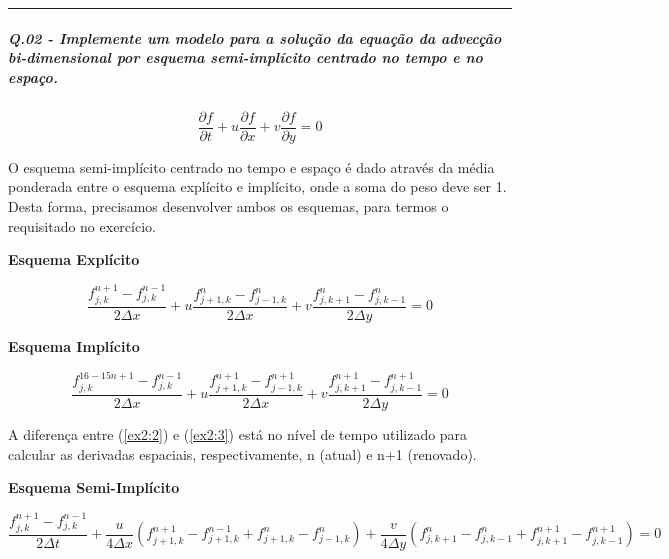 \documentclass[11pt]{article}
\begin{document}
    \begin{center}\rule{0.5\linewidth}{\linethickness}\end{center}

    \subparagraph{Q.02 - Implemente um modelo para a solução da equação da
advecção bi-dimensional por esquema semi-implícito centrado no tempo e
no
espaço.}\label{q.02---implemente-um-modelo-para-a-soluuxe7uxe3o-da-equauxe7uxe3o-da-advecuxe7uxe3o-bi-dimensional-por-esquema-semi-impluxedcito-centrado-no-tempo-e-no-espauxe7o.}

\begin{equation}
    \frac{\partial{f}}{\partial{t}} + u\frac{\partial{f}}{\partial{x}} + v\frac{\partial{f}}{\partial{y}} = 0
    \label{ex2:1}
\end{equation}

O esquema semi-implícito centrado no tempo e espaço é dado através da
média ponderada entre o esquema explícito e implícito, onde a soma do
peso deve ser 1. Desta forma, precisamos desenvolver ambos os esquemas,
para termos o requisitado no exercício.

\textbf{Esquema Explícito}

\begin{equation}
    \frac{ f^{n+1}_{j,k} - f^{n-1}_{j,k} }{2\Delta{x}} + u\frac{ f^{n}_{j+1,k} - f^{n}_{j-1,k} }{2\Delta{x}} + v\frac{f^{n}_{j,k+1} - f^{n}_{j,k-1}}{2\Delta{y}} = 0
    \label{ex2:2}
\end{equation}

\textbf{Esquema Implícito}

\begin{equation}
    \frac{ f^{16-15n+1}_{j,k} - f^{n-1}_{j,k} }{2\Delta{x}} + u\frac{ f^{n+1}_{j+1,k} - f^{n+1}_{j-1,k} }{2\Delta{x}} + v\frac{f^{n+1}_{j,k+1} - f^{n+1}_{j,k-1}}{2\Delta{y}} = 0
    \label{ex2:3}
\end{equation}

A diferença entre (\ref{ex2:2}) e (\ref{ex2:3}) está no nível de tempo
utilizado para calcular as derivadas espaciais, respectivamente, n
(atual) e n+1 (renovado).

\textbf{Esquema Semi-Implícito}

\begin{equation}
    \frac{f^{n+1}_{j,k} - f^{n-1}_{j,k}}{2\Delta{t}} + \frac{u}{4\Delta{x}}(f^{n+1}_{j+1,k} - f^{n-1}_{j+1,k} + f^{n}_{j+1,k} - f^{n}_{j-1,k}) + \frac{v}{4\Delta{y}}( f^{n}_{j,k+1} - f^{n}_{j,k-1} + f^{n+1}_{j,k+1} -f^{n+1}_{j,k-1} ) = 0
    \label{ex2:4}
\end{equation}
\end{document}
